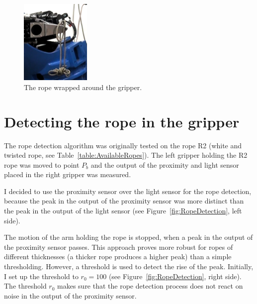         \begin{figure}[h]
        \includegraphics[width=0.3\textwidth]{WrappedRopeCloseUp.png}
        \centering
        \caption{The rope wrapped around the gripper.}
        \label{fig:WrappedRopeCloseUp}
        \end{figure}


    \section{Detecting the rope in the gripper} \label{sec:DetectingTheRope}

        The rope detection algorithm was originally tested on the rope R2 (white and twisted rope, see Table~\ref{table:AvailableRopes}). The left gripper holding the R2 rope was moved to point $P_b$ and the output of the proximity and light sensor placed in the right gripper was measured.

        I decided to use the proximity sensor over the light sensor for the rope detection, because the peak in the output of the proximity sensor was more distinct than the peak in the output of the light sensor (see Figure~\ref{fig:RopeDetection}, left side).

        The motion of the arm holding the rope is stopped, when a peak in the output of the proximity sensor passes. This approach proves more robust for ropes of different thicknesses (a thicker rope produces a higher peak) than a simple thresholding. However, a threshold is used to detect the rise of the peak. Initially, I set up the threshold to $r_0 = 100$ (see Figure~\ref{fig:RopeDetection}, right side). The threshold $r_0$ makes sure that the rope detection process does not react on noise in the output of the proximity sensor.


